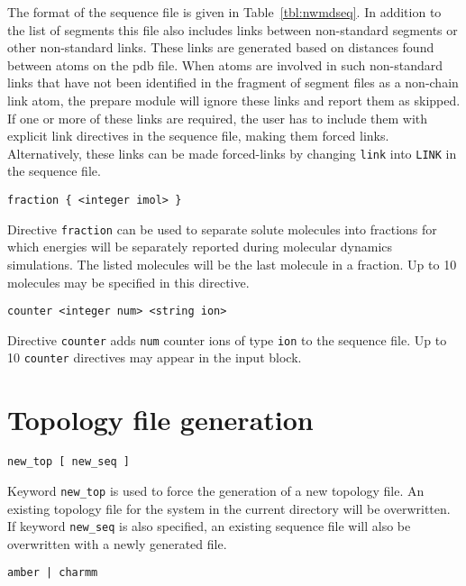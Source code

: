 \par
The format of the sequence file is given in Table~\ref{tbl:nwmdseq}.
In addition to the list of segments this file also includes links
between non-standard segments or other non-standard links. 
These links are generated based on distances found between
atoms on the pdb file. When atoms are involved in such non-standard 
links that have not been identified in the fragment of segment
files as a non-chain link atom, the prepare module will ignore
these links and report them as skipped. If one or more of these links
are required, the user has to include them with explicit link
directives in the sequence file, making them forced links.
Alternatively, these links can be made forced-links by changing 
\verb+link+ into \verb+LINK+ in the sequence file. 

\begin{verbatim}
fraction { <integer imol> }
\end{verbatim}

Directive \verb+fraction+ can be used to separate solute molecules
into fractions for which energies will be separately reported 
during molecular dynamics simulations. The listed molecules will be
the last molecule in a fraction. Up to 10 molecules may be
specified in this directive.

\begin{verbatim}
counter <integer num> <string ion>
\end{verbatim}

Directive \verb+counter+ adds \verb+num+ counter ions of type
\verb+ion+ to the sequence file. Up to 10 \verb+counter+
directives may appear in the input block.

\section{Topology file generation}

\begin{verbatim}
new_top [ new_seq ]
\end{verbatim}

Keyword \verb+new_top+ is used to force the generation of a new topology 
file. An existing topology file for the system in the current directory
will be overwritten. If keyword \verb+new_seq+ is also specified, an
existing sequence file will also be overwritten with a newly generated
file.

\begin{verbatim}
amber | charmm
\end{verbatim}

